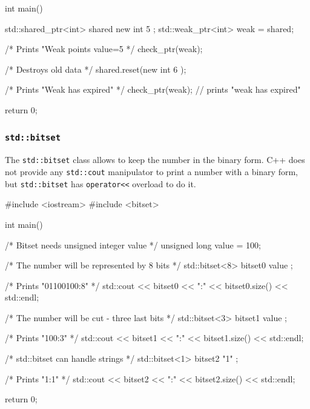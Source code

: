 \documentclass[../main]{subfiles}
\begin{document}
\begin{itemize}
\begin{Code}
        int main()
        {
            std::shared_ptr<int> shared { new int { 5 } };
            std::weak_ptr<int> weak = shared; 
    
            /* Prints "Weak points value=5 */
            check_ptr(weak);
    
            /* Destroys old data */
            shared.reset(new int { 6 });
    
            /* Prints "Weak has expired" */
            check_ptr(weak);  // prints "weak has expired"
            
            return 0;
        }
    \end{Code}
\end{itemize}

\subsubsection{\texttt{std::bitset}}
    The \texttt{std::bitset} class allows to keep the number in the binary form. C++ does not provide any \texttt{std::cout} manipulator to print a number
with a binary form, but \texttt{std::bitset} has \texttt{operator<<} overload to do it.
\begin{Code}
    #include <iostream>
    #include <bitset>
    
    int main()
    {
        /* Bitset needs unsigned integer value */ 
        unsigned long value = 100;
        
        /* The number will be represented by 8 bits */
        std::bitset<8> bitset0 { value };
        
        /* Prints "01100100:8" */
        std::cout << bitset0 << ":"
                  << bitset0.size() << std::endl;
                  
        /* The number will be cut - three last bits */
        std::bitset<3> bitset1 { value };
        
        /* Prints "100:3" */
        std::cout << bitset1 << ":"
                  << bitset1.size() << std::endl;
                  
        /* std::bitset can handle strings */
        std::bitset<1> bitset2 { "1" };
        
        /* Prints "1:1" */
        std::cout << bitset2 << ":"
                  << bitset2.size() << std::endl;
    
        return 0;
    }
\end{Code}
\end{document}
